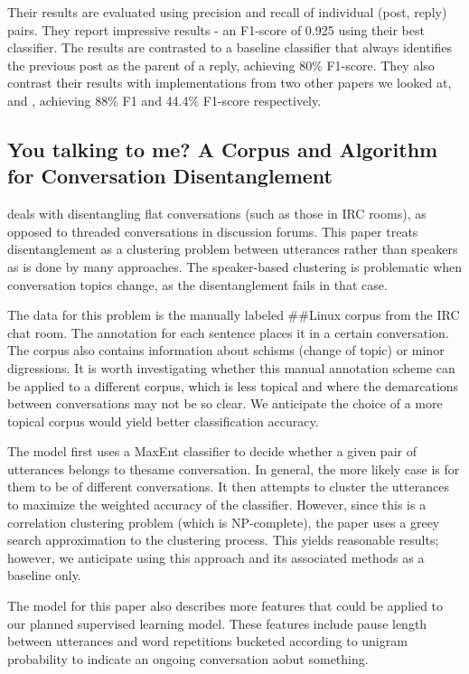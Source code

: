 \documentclass{article}
\begin{document}
Their results are evaluated using precision and recall of individual
(post, reply) pairs. They report impressive results - an F1-score of 0.925 using their best
classifier. The results are contrasted to a baseline classifier that always
identifies the previous post as the parent of a reply, achieving 80\% F1-score. 
They also contrast their results with implementations from two other papers we looked at,
\cite{Elsner2008a} and \cite{Wang2008a}, achieving 88\% F1 and 44.4\% F1-score
respectively.

\subsection{You talking to me? A Corpus and Algorithm for Conversation Disentanglement}
\cite{Elsner2008a} deals with disentangling flat conversations (such as those in IRC rooms), as opposed to threaded conversations in discussion forums. This paper treats disentanglement as a clustering problem between utterances rather than speakers as is done by many approaches. The speaker-based clustering is problematic when conversation topics change, as the disentanglement fails in that case.

The data for this problem is the manually labeled \#\#Linux corpus from the IRC chat room. The annotation for each sentence places it in a certain conversation. The corpus also contains information about schisms (change of topic) or minor digressions. It is worth investigating whether this manual annotation scheme can be applied to a different corpus, which is less topical and where the demarcations between conversations may not be so clear. We anticipate the choice of a more topical corpus would yield better classification accuracy.

The model first uses a MaxEnt classifier to decide whether a given pair of utterances belongs to thesame conversation. In general, the more likely case is for them to be of different conversations. It then attempts to cluster the utterances to maximize the weighted accuracy of the classifier. However, since this is a correlation clustering problem (which is NP-complete), the paper uses a greey search approximation to the clustering process. This yields reasonable results; however, we anticipate using this approach and its associated methods as a baseline only.

The model for this paper also describes more features that could be applied to our planned supervised learning model. These features include pause length between utterances and word repetitions bucketed according to unigram probability to indicate an ongoing conversation aobut something.
\end{document}

